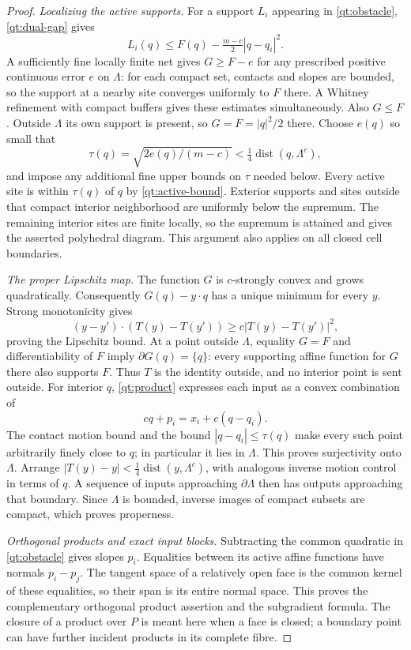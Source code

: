 \documentclass[11pt]{article}
\numberwithin{equation}{section}
\theoremstyle{definition}
\theoremstyle{remark}
\DeclareMathOperator{\dist}{dist}
\begin{document}
\begin{proof}
\emph{Localizing the active supports.}
For a support $L_i$ appearing in \eqref{qt:obstacle},
\eqref{qt:dual-gap} gives
\begin{equation}\label{qt:active-bound}
 L_i(q)\leq F(q)-\tfrac{m-c}{2}|q-q_i|^2.
\end{equation}
A sufficiently fine locally finite net gives $G\geq F-e$ for any
prescribed positive continuous error $e$ on $\Lambda$: for each compact
set, contacts and slopes are bounded, so the support at a nearby site
converges uniformly to $F$ there.  A Whitney refinement with compact
buffers gives these estimates simultaneously.  Also $G\leq F$.
Outside $\Lambda$ its own support is present, so $G=F=|q|^2/2$ there.
Choose $e(q)$ so small that
\[
 \tau(q)=\sqrt{2e(q)/(m-c)}<\tfrac14\dist(q,\Lambda^c),
\]
and impose any additional fine upper bounds on $\tau$ needed below.
Every active site is within $\tau(q)$ of $q$ by
\eqref{qt:active-bound}.  Exterior supports and sites outside that
compact interior neighborhood are uniformly below the supremum.
The remaining interior sites are finite locally, so the supremum is
attained and gives the asserted polyhedral diagram.  This argument
also applies on all closed cell boundaries.

\emph{The proper Lipschitz map.}
The function $G$ is $c$-strongly convex and grows quadratically.
Consequently $G(q)-y\cdot q$ has a unique minimum for every $y$.
Strong monotonicity gives
\[
 (y-y')\cdot(T(y)-T(y'))\geq c|T(y)-T(y')|^2,
\]
proving the Lipschitz bound.  At a point outside $\Lambda$, equality
$G=F$ and differentiability of $F$ imply $\partial G(q)=\{q\}$:
every supporting affine function for $G$ there also supports $F$.
Thus $T$ is the identity outside, and no interior point is sent outside.
For interior $q$, \eqref{qt:product} expresses each input as a convex
combination of
\[
 cq+p_i=x_i+c(q-q_i).
\]
The contact motion bound and the bound $|q-q_i|\leq\tau(q)$ make every
such point arbitrarily finely close to $q$; in particular it lies in
$\Lambda$.  This proves surjectivity onto $\Lambda$.  Arrange
$|T(y)-y|<\tfrac14\dist(y,\Lambda^c)$, with analogous inverse motion
control in terms of $q$.  A sequence of inputs approaching
$\partial\Lambda$ then has outputs approaching that boundary.  Since
$\Lambda$ is bounded, inverse images of compact subsets are compact,
which proves properness.

\emph{Orthogonal products and exact input blocks.}
Subtracting the common quadratic in \eqref{qt:obstacle} gives slopes
$p_i$.  Equalities between its active affine functions have normals
$p_i-p_j$.  The tangent space of a relatively open face is the common
kernel of these equalities, so their span is its entire normal space.
This proves the complementary orthogonal product assertion and the
subgradient formula.  The closure of a product over $P$ is meant here
when a face is closed; a boundary point can have further incident
products in its complete fibre.


\end{proof}
\end{document}
